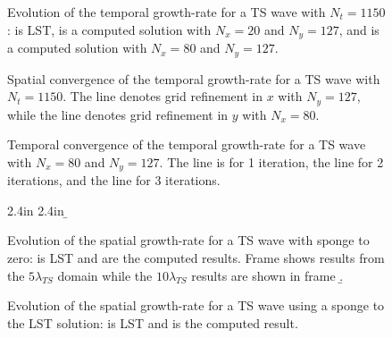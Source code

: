%
%
%
%
\begin{figure}[p]
\centering
{}
\setvlabel{ $\sigma$ }
\epsfxsize=5.0in 
\caption[Evolution of the temporal growth-rate for a TS wave] {Evolution of the
temporal growth-rate for a TS wave with $N_t=1150$: \solid is LST, \dashed is
a computed solution with $N_x=20$ and $N_y=127$, and \dotted is a computed
solution with $N_x=80$ and $N_y=127$. \label{f:ttsgrowth}}
\end{figure}
%
\begin{figure}[p]
\centering
{}
\epsfxsize=4.5in 
\caption[Spatial convergence of the temporal growth-rate for a TS wave]
{Spatial convergence of the temporal growth-rate for a TS wave with
$N_t=1150$.  The \solid line denotes grid refinement in $x$ with $N_y=127$,
while the \dashed line denotes grid refinement in $y$ with
$N_x=80$. \label{f:spconv} }
\end{figure}
%
\begin{figure}[p]
\centering
{}
\epsfxsize=4.5in 
\caption[Temporal convergence of the temporal growth-rate for a TS wave]
{Temporal convergence of the temporal growth-rate for a TS wave with $N_x=80$
and $N_y=127$.  The \solid line is for 1 iteration, the \dashed line for 2
iterations, and the \dotted line for 3 iterations. \label{f:tmconv} }
\end{figure}
%
%
\begin{figure}[p]
\centering
{}
\setvlabel{$\sigma$}
\figlab 1.0in 2.4in {\a} 
\epsfxsize=5.0in 
\bigskip
{}
\setvlabel{$\sigma$}
\figlab 1.0in 2.4in {\b} 
\epsfxsize=5.0in 
\caption[Evolution of the spatial growth-rate for a TS wave with sponge to
zero] {Evolution of the spatial growth-rate for a TS wave with sponge to zero:
\solid is LST and \dashed are the computed results.  Frame \a shows results
from the $5 \lambda_{TS}$ domain while the $10 \lambda_{TS}$ results are shown
in frame \b. \label{f:stsgrowth}}
\end{figure}
%
\begin{figure}[p]
\centering
{}
\setvlabel{$\sigma$}
\epsfxsize=5.0in 
\caption[Evolution of the spatial growth-rate for a TS wave using a sponge to
the LST solution] {Evolution of the spatial growth-rate for a TS wave using a
sponge to the LST solution: \solid is LST and \dashed is the computed result.
\label{f:stsgrowth2}}
\end{figure}
